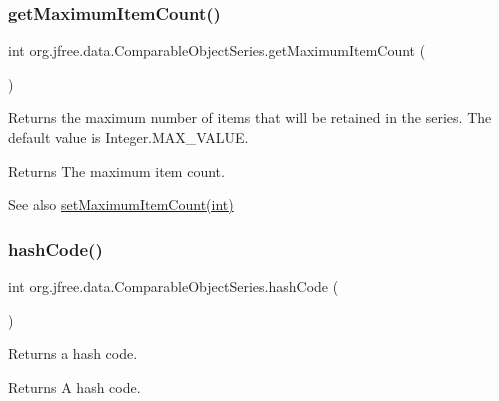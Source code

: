 \subsubsection{\texorpdfstring{get\+Maximum\+Item\+Count()}{getMaximumItemCount()}}
{\footnotesize\ttfamily int org.\+jfree.\+data.\+Comparable\+Object\+Series.\+get\+Maximum\+Item\+Count (\begin{DoxyParamCaption}{ }\end{DoxyParamCaption})}

Returns the maximum number of items that will be retained in the series. The default value is {\ttfamily Integer.\+M\+A\+X\+\_\+\+V\+A\+L\+UE}.

\begin{DoxyReturn}{Returns}
The maximum item count. 
\end{DoxyReturn}
\begin{DoxySeeAlso}{See also}
\mbox{\hyperlink{classorg_1_1jfree_1_1data_1_1_comparable_object_series_a77eb1fe6cae39738587baf49592266ab}{set\+Maximum\+Item\+Count(int)}} 
\end{DoxySeeAlso}
\mbox{\label{classorg_1_1jfree_1_1data_1_1_comparable_object_series_a60758c8d338dff3da555d2d20cc7a453}} 
\subsubsection{\texorpdfstring{hash\+Code()}{hashCode()}}
{\footnotesize\ttfamily int org.\+jfree.\+data.\+Comparable\+Object\+Series.\+hash\+Code (\begin{DoxyParamCaption}{ }\end{DoxyParamCaption})}

Returns a hash code.

\begin{DoxyReturn}{Returns}
A hash code. 
\end{DoxyReturn}
\mbox{\label{classorg_1_1jfree_1_1data_1_1_comparable_object_series_a7b9611f61db44619d70344397d15ab42}} 

